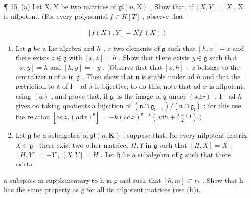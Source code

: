 ¶ 15. (a) Let X, Y be two matrices of \(\mathfrak{gl}(n, \mathrm{K})\) . Show that, if \([X, Y] = X\) , X is nilpotent. (For every polynomial \(f \in K[T]\) , observe that

\[
[ f (X), Y ] = X f ^ {\prime} (X).)
\]

\begin{enumerate}
\def\labelenumi{(\alph{enumi})}
\setcounter{enumi}{1}
\item
  Let \(\mathfrak{g}\) be a Lie algebra and \(h\) , \(x\) two elements of \(\mathfrak{g}\) such that \([h, x] = x\) and there exists \(z \in \mathfrak{g}\) with \([x, z] = h\) . Show that there exists \(y \in \mathfrak{g}\) such that \([x, y] = h\) and \([h, y] = -y\) . (Observe first that \([z, h] + z\) belongs to the centralizer \(\mathfrak{n}\) of \(x\) in \(\mathfrak{g}\) . Then show that \(\mathfrak{n}\) is stable under ad \(h\) and that the restriction to \(\mathfrak{n}\) of I - ad \(h\) is bijective; to do this, note that ad \(x\) is nilpotent, using \((a)\) , and prove that, if \(\mathfrak{g}_{\mathfrak{l}}\) is the image of \(\mathfrak{g}\) under \((\mathrm{ad}x)^{\mathfrak{l}}\) , I - ad \(h\) gives on taking quotients a bijection of \((\mathfrak{n} \cap \mathfrak{g}_{\mathfrak{l}-1}) / (\mathfrak{n} \cap \mathfrak{g}_{\mathfrak{l}})\) ; for this use the relation \([\mathrm{ad}z, (\mathrm{ad}x)^{\mathfrak{k}}] = -k(\mathrm{ad}x)^{\mathfrak{k}-1}(\mathrm{ad}h + \frac{k-1}{2}I).)\)
\item
  Let \(\mathfrak{g}\) be a subalgebra of \(\mathfrak{gl}(n, \mathbf{K})\) ; suppose that, for every nilpotent matrix \(X \in \mathfrak{g}\) , there exist two other matrices \(H, Y\) in \(\mathfrak{g}\) such that \([H, X] = X\) , \([H, Y] = -Y\) , \([X, Y] = H\) . Let \(\mathfrak{h}\) be a subalgebra of \(\mathfrak{g}\) such that there exists
\end{enumerate}

a subspace m supplementary to h in g and such that \([h, m] \subset m\) . Show that h has the same property as g for all its nilpotent matrices (use (b)).

